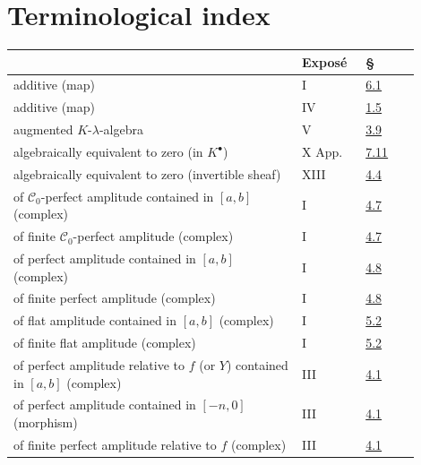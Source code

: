 
\newpage
{}\section*{Terminological index}
\begingroup\small
\begin{longtable}{@{}>{\raggedright\arraybackslash}p{0.64\linewidth}>{\raggedright\arraybackslash}p{0.14\linewidth}>{\raggedright\arraybackslash}p{0.12\linewidth}@{}}
\toprule
 & Exposé & §\\
\midrule
\endhead
additive (map) & I & \hyperlink{sga6.e01.def.6-1}{6.1}\\
additive (map) & IV & \hyperlink{sga6.e04.para.1-5}{1.5}\\
augmented \(K\)-\(\lambda\)-algebra & V & \hyperlink{sga6.e05.def.3-9}{3.9}\\
algebraically equivalent to zero (in \(K^\bullet\)) & X App. & \hyperlink{sga6.e10.para.7-11}{7.11}\\
algebraically equivalent to zero (invertible sheaf) & XIII & \hyperlink{sga6.e13.para.4-4}{4.4}\\
of \(\mathcal C_0\)-perfect amplitude contained in \([a,b]\) (complex) & I & \hyperlink{sga6.e01.def.4-7}{4.7}\\
of finite \(\mathcal C_0\)-perfect amplitude (complex) & I & \hyperlink{sga6.e01.def.4-7}{4.7}\\
of perfect amplitude contained in \([a,b]\) (complex) & I & \hyperlink{sga6.e01.ex.4-8}{4.8}\\
of finite perfect amplitude (complex) & I & \hyperlink{sga6.e01.ex.4-8}{4.8}\\
of flat amplitude contained in \([a,b]\) (complex) & I & \hyperlink{sga6.e01.def.5-2}{5.2}\\
of finite flat amplitude (complex) & I & \hyperlink{sga6.e01.def.5-2}{5.2}\\
of perfect amplitude relative to \(f\) (or \(Y\)) contained in \([a,b]\) (complex) & III & \hyperlink{sga6.e03.def.4-1}{4.1}\\
of perfect amplitude contained in \([-n,0]\) (morphism) & III & \hyperlink{sga6.e03.def.4-1}{4.1}\\
of finite perfect amplitude relative to \(f\) (complex) & III & \hyperlink{sga6.e03.def.4-1}{4.1}\\

\end{longtable}
